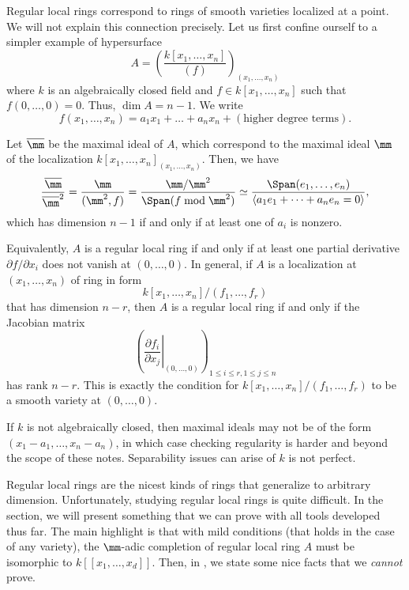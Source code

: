 \begin{example}
Regular local rings correspond to rings of smooth varieties
localized at a point.
We will not explain this connection precisely.
Let us first confine ourself to a simpler example of hypersurface
$$A = \left(\frac{k[x_1,\dots,x_n]}{(f)}\right)_{(x_1,\dots,x_n)}$$
where $k$ is an algebraically closed field
and $f\in k[x_1,\dots,x_n]$ such that $f(0,\dots,0)=0$.
Thus, $\dim A = n-1$.
We write
$$f(x_1,\dots,x_n) = a_1x_1 + \dots + a_nx_n + 
(\text{higher degree terms}).$$

Let $\overline\mm$ be the maximal ideal of $A$,
which correspond to the maximal ideal $\mm$ 
of the localization 
$k[x_1,\dots,x_n]_{(x_1,\dots,x_n)}$. Then, we have
$$\frac{\overline\mm}{\overline\mm^2} 
= \frac{\mm}{(\mm^2, f)}
= \frac{\mm/\mm^2}{\Span(f\bmod \mm^2)}
\simeq \frac{\Span(e_1,\dots,e_n)}{\langle a_1e_1+\dots+a_ne_n=0
\rangle},$$
which has dimension $n-1$ if and only if 
at least one of $a_i$ is nonzero.

Equivalently, $A$ is a regular local ring if and only if
at least one partial derivative 
$\partial f / \partial x_i$ does not vanish at $(0,\dots,0)$.
\tcbline
In general, if $A$ is a localization at $(x_1,\dots,x_n)$ of
ring in form
$$k[x_1,\dots,x_n]/(f_1,\dots,f_r)$$
that has dimension $n-r$,
then $A$ is a regular local ring if and only if
the Jacobian matrix
$$\left(\left.\frac{\partial f_i}{\partial x_j}\right|_{(0,\dots,0)}\right)
_{1\leq i\leq r, 1\leq j\leq n}$$
has rank $n-r$. This is exactly the condition for
$k[x_1,\dots,x_n]/(f_1,\dots,f_r)$ to be a smooth variety
at $(0,\dots,0)$.

If $k$ is not algebraically closed, then 
maximal ideals may not be of the form $(x_1-a_1,\dots,x_n-a_n)$,
in which case checking regularity is harder
and beyond the scope of these notes.
Separability issues can arise of $k$ is not perfect.
\end{example}

Regular local rings are the nicest kinds of rings
that generalize to arbitrary dimension.
Unfortunately, studying regular local rings is quite
difficult. In the section, we will present something
that we can prove with all tools developed thus far.
The main highlight is that with mild conditions
(that holds in the case of any variety),
the $\mm$-adic completion of regular local ring $A$
must be isomorphic to $k[[x_1,\dots,x_d]]$.
Then, in , 
we state some nice facts that we \emph{cannot} prove.

